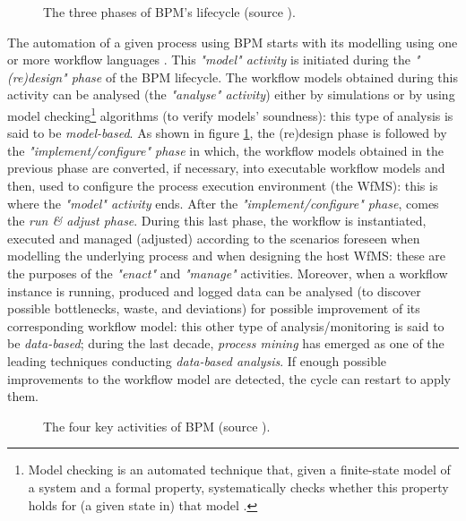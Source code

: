 \label{chap1:sec:bpm-lifecycle}
\begin{figure}[ht!]
	\noindent
	\caption{The three phases of BPM's lifecycle (source \cite{van2013business}).}
	\label{chap1:fig:bpm-lifecycle}
\end{figure}

The automation of a given process using BPM starts with its modelling using one or more workflow languages \cite{dumas2018fundamental}. This \textit{"model" activity} is initiated during the \textit{"(re)design" phase} of the BPM lifecycle. The workflow models obtained during this activity can be analysed (the \textit{"analyse" activity}) either by simulations or by using model checking\footnote{Model checking is an automated technique that, given a finite-state model of a system and a formal property, systematically checks whether this property holds for (a given state in) that model \cite{baier2008principles}.} algorithms (to verify models' soundness): this type of analysis is said to be \textit{model-based}. 
As shown in figure \ref{chap1:fig:bpm-lifecycle}, the (re)design phase is followed by the \textit{"implement/configure" phase} in which, the workflow models obtained in the previous phase are converted, if necessary, into executable workflow models and then, used to configure the process execution environment (the WfMS): this is where the \textit{"model" activity} ends. 
After the \textit{"implement/configure" phase}, comes the \textit{run \& adjust phase}. During this last phase, the workflow is instantiated, executed and managed (adjusted) according to the scenarios foreseen when modelling the underlying process and when designing the host WfMS: these are the purposes of the \textit{"enact"} and \textit{"manage"} activities. Moreover, when a workflow instance is running, produced and logged data can be analysed (to discover possible bottlenecks, waste, and deviations) for possible improvement of its corresponding workflow model: this other type of analysis/monitoring is said to be \textit{data-based}; during the last decade, \textit{process mining} \cite{van2011process} has emerged as one of the leading techniques conducting \textit{data-based analysis}. If enough possible improvements to the workflow model are detected, the cycle can restart to apply them.
\begin{figure}[ht!]
	\noindent
	\caption{The four key activities of BPM (source \cite{van2013business}).}
	\label{chap1:fig:bpm-key-concerns}
\end{figure}



